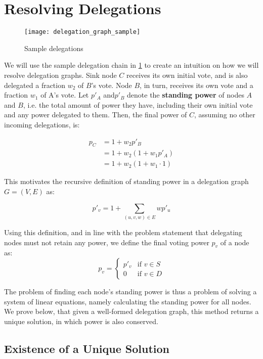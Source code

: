 \section{Resolving Delegations}
\label{sec:resolving_delegations}

\begin{figure}[t]
	\centering
	\texttt{[image: delegation\_graph\_sample]}
	\caption{Sample delegations}
	\label{fig:sample_delegations}
\end{figure}

We will use the sample delegation chain in \cref{fig:sample_delegations} to create an intuition on how we will resolve delegation graphs. Sink node $C$ receives its own initial vote, and is also delegated a fraction $w_2$ of $B$'s vote. Node $B$, in turn, receives its own vote and a fraction $w_1$ of A's vote. Let $p'_A$ and$ p'_B$ denote the \textbf{standing power} of nodes $A$ and $B$, i.e. the total amount of power they have, including their own initial vote and any power delegated to them. Then, the final power of $C$, assuming no other incoming delegations, is:

\begin{align*}
p_C &= 1 + w_2p'_B \\
&= 1 + w_2(1 + w_1p'_A) \\
&= 1 + w_2(1 + w_1 \cdot 1)
\end{align*}

This motivates the recursive definition of standing power in a delegation graph $G = (V, E)$ as:

\[
p'_v = 1 + \sum_{(u, v, w) \in E} wp'_u
\]

Using this definition, and in line with the problem statement that delegating nodes must not retain any power, we define the final voting power $p_v$ of a node as:
\[
p_v = 
\begin{cases}
p'_v & \text{if } v \in S \\
0     & \text{if } v \in D
\end{cases}
\]

The problem of finding each node's standing power is thus a problem of solving a system of linear equations, namely calculating the standing power for all nodes. We prove below, that given a well-formed delegation graph, this method returns a unique solution, in which power is also conserved.

\subsection{Existence of a Unique Solution}
\label{subsec:unique_sol}

